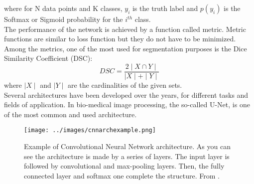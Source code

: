 \documentclass{standalone}
\begin{document}
where for N data points and K classes, $y_i$ is the truth label and $p(y_i)$ is the Softmax or Sigmoid probability for the $i^{th}$ class.
\\
The performance of the network is achieved by a function called metric.
Metric functions are similar to loss function but they do not have to be minimized.
Among the metrics, one of the most used for segmentation purposes is the Dice Similarity Coefficient (DSC): 
\begin{equation}
    DSC = \frac{2 \mid X \cap Y \mid}{\mid X \mid + \mid Y \mid}
\end{equation}\label{diceloss}
where $\mid X \mid$ and $\mid Y \mid$ are the cardinalities of the given sets.
\\
Several architectures have been developed over the years, for different tasks and fields of application.
In bio-medical image processing, the so-called U-Net\cite{unet}, is one of the most common and used architecture.

\begin{figure}[ht]

    \centering
    \texttt{[image: ../images/cnnarchexample.png]}

    \caption{Example of Convolutional Neural Network architecture. As you can see the architecture is made by a series of layers. The input layer is followed by convolutional and max-pooling layers. Then, the fully connected layer and softmax one complete the structure. From \cite{Trebeschi2017}.}
    \label{examplecnn}
    
    \end{figure}
\end{document}
